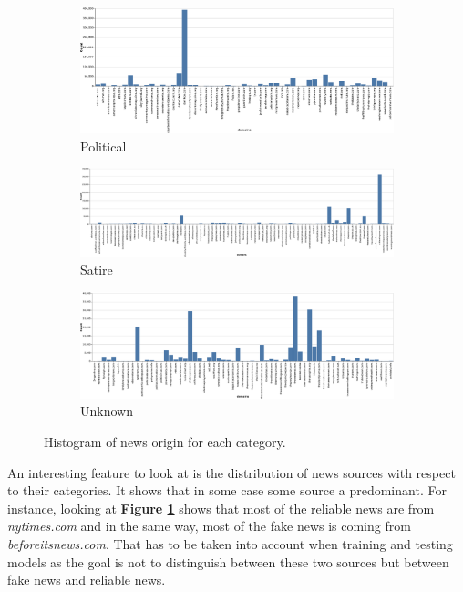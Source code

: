 \begin{figure}\ContinuedFloat
    \begin{subfigure}[b]{1\textwidth}
         \centering
         \includegraphics[width=\textwidth]{images/data_exploration/political.eps}
         \caption{Political}
     \end{subfigure}
     \vfill
     \begin{subfigure}[b]{1\textwidth}
         \centering
         \includegraphics[width=\textwidth]{images/data_exploration/satire.eps}
         \caption{Satire}
     \end{subfigure}
     \vfill
     \begin{subfigure}[b]{1\textwidth}
         \centering
         \includegraphics[width=\textwidth]{images/data_exploration/unknown.eps}
         \caption{Unknown}
     \end{subfigure}
        \caption{Histogram of news origin for each category.}
        \label{fig:data_explo:source}
\end{figure}
 An interesting feature to look at is the distribution of news sources with respect to their categories. It shows that in some case some source a predominant. For instance, looking at \textbf{Figure \ref{fig:data_explo:source}} shows that most of the reliable news are from \textit{nytimes.com} and in the same way, most of the fake news is coming from \textit{beforeitsnews.com}. That has to be taken into account when training and testing models as the goal is not to distinguish between these two sources but between fake news and reliable news. \\
